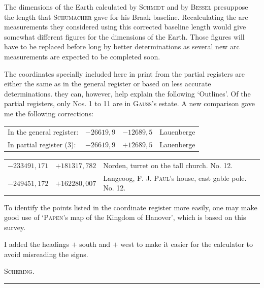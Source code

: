 The dimensions of the Earth calculated by \textsc{Schmidt} and by \textsc{Bessel} presuppose the length that \textsc{Schumacher} gave for his Braak baseline. Recalculating the arc measurements they considered using this corrected baseline length would give somewhat different figures for the dimensions of the Earth. Those figures will have to be replaced before long by better determinations as several new arc measurements are expected to be completed soon.

The coordinates specially included here in print from the partial registers are either the same as in the general register or based on less accurate determinations. they can, however, help explain the following ‘Outlines’. Of the partial registers, only Nos. 1 to 11 are in \textsc{Gauss}’s estate. A new comparison gave me the following corrections:
\begin{center}\small\begin{tabular}{@{}p{.39\linewidth}rrp{.16\linewidth}@{}}
In the general register:&\(-26619{,}9\)&\(-12689{,}5\)&Lauenberge\\
In partial register (3):&\(-26619{,}9\)&\(+12689{,}5\)&Lauenberge
\end{tabular}\end{center}
\begin{center}\begin{tabular}{@{}rrp{.55\linewidth}@{}}
\(-233491{,}171\)&\(+181317{,}782\)&Norden, turret on the tall church. No. 12.\\
\(-249451{,}172\)&\(+162280{,}007\)&Langeoog, F. J. \textsc{Paul}’s house, east gable pole. No. 12.
\end{tabular}\end{center}

To identify the points listed in the coordinate register more easily, one may make good use of ‘\textsc{Papen}’s map of the Kingdom of Hanover’, which is based on this survey.

I added the headings \(+\) south and \(+\) west to make it easier for the calculator to avoid misreading the signs.
\begin{flushright}\textsc{Schering.}\end{flushright}
\begin{center}\rule{.23\linewidth}{.3pt}\end{center}
